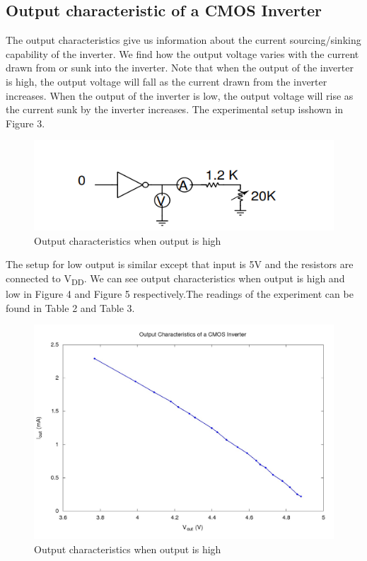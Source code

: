 \documentclass[12pt]{article}
\begin{document}
\subsection{Output characteristic of a CMOS Inverter}
The output characteristics give us information about the current sourcing/sinking
capability of the inverter. We find how the output voltage varies with
the current drawn from or sunk into the inverter. Note that when the output
of the inverter is high, the output voltage will fall as the current drawn from
the inverter increases. When the output of the inverter is low, the output
voltage will rise as the current sunk by the inverter increases.
The experimental setup isshown in Figure 3.
\begin{figure}[h]
    \centering
    \includegraphics{figs/inputlow.png}
    \caption{Output characteristics when output is high}

    \label{fig:my_label}
\end{figure} 
The setup for low output is similar except that input is 5V and the resistors are connected to V\textsubscript{DD}. We can see  output characteristics when output is high and low in Figure 4 and Figure 5 respectively.The readings of the experiment can be found in Table 2 and Table 3.
\begin{figure}[t]
    \centering
    \includegraphics[scale = .40]{figs/When_input_zero.jpg}
    \caption{Output characteristics when output is high}
    \label{fig:my_label}
\end{figure}
\end{document}
